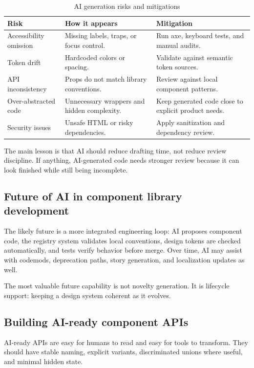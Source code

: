 \begin{table}[htbp]
  \centering
  \caption{AI generation risks and mitigations}
  \begin{tabularx}{\textwidth}{@{}p{}p{}Y@{}}
    \toprule
    \textbf{Risk} & \textbf{How it appears} & \textbf{Mitigation} \\
    \midrule
    Accessibility omission & Missing labels, traps, or focus control. & Run axe, keyboard tests, and manual audits. \\
    Token drift & Hardcoded colors or spacing. & Validate against semantic token sources. \\
    API inconsistency & Props do not match library conventions. & Review against local component patterns. \\
    Over-abstracted code & Unnecessary wrappers and hidden complexity. & Keep generated code close to explicit product needs. \\
    Security issues & Unsafe HTML or risky dependencies. & Apply sanitization and dependency review. \\
    \bottomrule
  \end{tabularx}
\end{table}

The main lesson is that AI should reduce drafting time, not reduce review discipline. If anything, AI-generated code needs stronger review because it can look finished while still being incomplete.

\subsection{Future of AI in component library development}
The likely future is a more integrated engineering loop: AI proposes component code, the registry system validates local conventions, design tokens are checked automatically, and tests verify behavior before merge. Over time, AI may assist with codemods, deprecation paths, story generation, and localization updates as well.

The most valuable future capability is not novelty generation. It is lifecycle support: keeping a design system coherent as it evolves.

\subsection{Building AI-ready component APIs}
AI-ready APIs are easy for humans to read and easy for tools to transform. They should have stable naming, explicit variants, discriminated unions where useful, and minimal hidden state.

